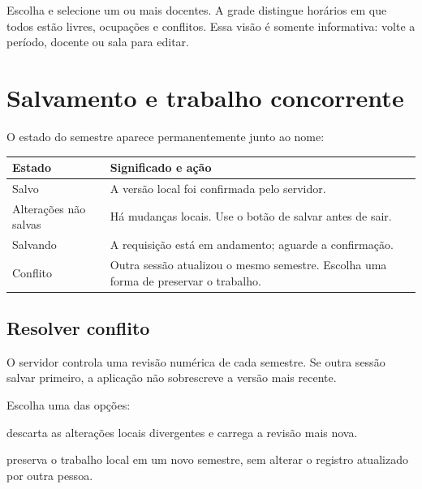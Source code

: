 Escolha  e selecione um ou mais docentes. A grade distingue horários em que todos estão livres, ocupações e conflitos. Essa visão é somente informativa: volte a período, docente ou sala para editar.


\chapter{Salvamento e trabalho concorrente}

O estado do semestre aparece permanentemente junto ao nome:

\begin{longtable}{@{}p{}p{}@{}}
\toprule
\textbf{Estado} & \textbf{Significado e ação} \\
\midrule
\endhead
Salvo & A versão local foi confirmada pelo servidor. \\
Alterações não salvas & Há mudanças locais. Use o botão de salvar antes de sair. \\
Salvando & A requisição está em andamento; aguarde a confirmação. \\
Conflito & Outra sessão atualizou o mesmo semestre. Escolha uma forma de preservar o trabalho. \\
\bottomrule
\end{longtable}


\section{Resolver conflito}

O servidor controla uma revisão numérica de cada semestre. Se outra sessão salvar primeiro, a aplicação não sobrescreve a versão mais recente.


Escolha uma das opções:

\begin{description}[style=nextline,leftmargin=0pt]
  \item[Recarregar servidor] descarta as alterações locais divergentes e carrega a revisão mais nova.
  \item[Salvar como cópia] preserva o trabalho local em um novo semestre, sem alterar o registro atualizado por outra pessoa.
\end{description}

